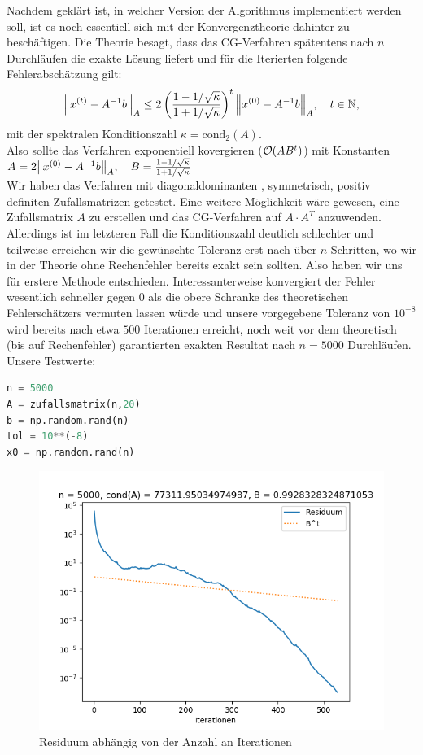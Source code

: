 Nachdem geklärt ist, in welcher Version der Algorithmus implementiert werden soll, ist es noch essentiell sich mit der
Konvergenztheorie dahinter zu beschäftigen.
Die Theorie besagt, dass das CG-Verfahren spätentens nach $n$ Durchläufen die exakte Lösung liefert und für die Iterierten
folgende Fehlerabschätzung gilt:
\begin{align*}
  {\left \| x^{(t)}-A^{-1}b \right \|}_A \leq 2\left(\frac{1-1/\sqrt{\kappa}}{1+1/\sqrt{\kappa}}\right)^t{\left \| x^{(0)}-A^{-1}b \right \|}_A, \quad t \in \mathbb{N},
\end{align*}
mit der spektralen Konditionszahl $\kappa = \text{cond}_2(A)$. \\
Also sollte das Verfahren exponentiell kovergieren ($\mathcal{O} {\left ( AB^t \right )}$) mit Konstanten\\
$A = 2{\left \| x^{(0)}-A^{-1}b \right \|}_A, \quad B = \frac{1-1/\sqrt{\kappa}}{1+1/\sqrt{\kappa}}$\\
Wir haben das Verfahren mit diagonaldominanten , symmetrisch, positiv definiten Zufallsmatrizen getestet. Eine weitere
Möglichkeit wäre gewesen, eine Zufallsmatrix $A$ zu erstellen und das CG-Verfahren auf $A\cdot A^T$ anzuwenden. Allerdings ist
im letzteren Fall die Konditionszahl deutlich schlechter und teilweise erreichen wir die gewünschte Toleranz erst nach über $n$
Schritten, wo wir in der Theorie ohne Rechenfehler bereits exakt sein sollten. Also haben wir uns für erstere Methode entschieden.
Interessanterweise konvergiert der Fehler wesentlich schneller gegen 0 als die obere Schranke des theoretischen Fehlerschätzers
vermuten lassen würde und unsere vorgegebene Toleranz von $10^{-8}$ wird bereits
nach etwa $500$ Iterationen erreicht, noch weit vor dem theoretisch
(bis auf Rechenfehler) garantierten exakten Resultat nach $n = 5000$ Durchläufen.
Unsere Testwerte: \\

\begin{lstlisting}[language=Python]
n = 5000
A = zufallsmatrix(n,20)
b = np.random.rand(n)
tol = 10**(-8)
x0 = np.random.rand(n)
\end{lstlisting}

\begin{figure}
    \centering
    \includegraphics[width=\linewidth]{Aufgabe_1/c.png}
    \caption{Residuum abhängig von der Anzahl an Iterationen}
    \label{fig:my_label}
\end{figure}
\FloatBarrier
